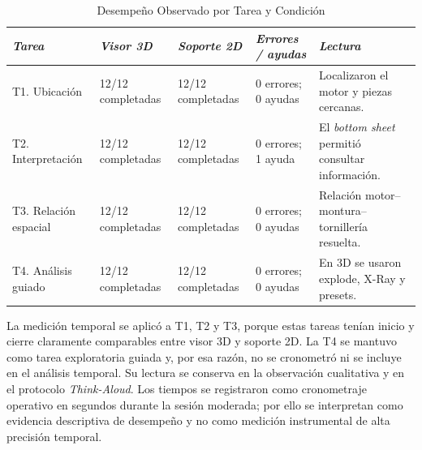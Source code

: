 \begin{table}[htbp]
    \caption{Desempeño Observado por Tarea y Condición}
    \label{tab:desempeno_tareas_condicion}
    \begin{tabularx}{\textwidth}{p{3.1cm}p{2.2cm}p{2.2cm}p{2.2cm}X}
        \hline
        \textit{Tarea} & \textit{Visor 3D} & \textit{Soporte 2D} & \textit{Errores / ayudas} & \textit{Lectura} \\ \hline
        T1. Ubicación & 12/12 completadas & 12/12 completadas & 0 errores; 0 ayudas & Localizaron el motor y piezas cercanas. \\
        T2. Interpretación & 12/12 completadas & 12/12 completadas & 0 errores; 1 ayuda & El \textit{bottom sheet} permitió consultar información. \\
        T3. Relación espacial & 12/12 completadas & 12/12 completadas & 0 errores; 0 ayudas & Relación motor--montura--tornillería resuelta. \\
        T4. Análisis guiado & 12/12 completadas & 12/12 completadas & 0 errores; 0 ayudas & En 3D se usaron explode, X-Ray y presets. \\ \hline
    \end{tabularx}
\end{table}

La medición temporal se aplicó a T1, T2 y T3, porque estas tareas tenían inicio y cierre claramente comparables entre visor 3D y soporte 2D. La T4 se mantuvo como tarea exploratoria guiada y, por esa razón, no se cronometró ni se incluye en el análisis temporal. Su lectura se conserva en la observación cualitativa y en el protocolo \textit{Think-Aloud}. Los tiempos se registraron como cronometraje operativo en segundos durante la sesión moderada; por ello se interpretan como evidencia descriptiva de desempeño y no como medición instrumental de alta precisión temporal.

